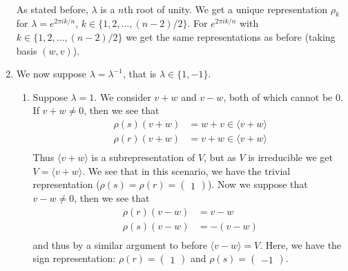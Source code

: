 \begin{questions}
\begin{solution}
\begin{enumerate}
\begin{align*}
            \end{align*}
            As stated before, $\lambda$ is a $n$th root of unity.
            We get a unique representation $\rho_k$ for $\lambda = e^{2\pi i k/n}$, $k \in \{1,2,\ldots,(n-2)/2\}$. For $e^{2\pi i k/n}$ with $k \in \{1,2,\ldots,(n-2)/2\}$ we get the same representations as before (taking basis $(w, v)$).
      \item We now suppose $\lambda = \lambda^{-1}$, that is $\lambda \in \{1, -1\}$.
            \begin{enumerate}
              \item Suppose $\lambda = 1$. We consider $v+w$ and $v-w$, both of which cannot be 0. If $v + w \neq 0$, then we see that
                    \begin{align*}
                      \rho(s)(v + w) & = w + v \in \langle v + w \rangle \\
                      \rho(r)(v + w) & = v + w \in \langle v + w \rangle \\
                    \end{align*}
                    Thus $\langle v + w \rangle$ is a subrepresentation of $V$, but as $V$ is irreducible we get $V = \langle v + w \rangle$. We see that in this scenario, we have the trivial representation ($\rho(s) = \rho(r) = \begin{pmatrix} 1 \end{pmatrix}$). Now we suppose that $v - w \neq 0$, then we see that
                    \begin{align*}
                      \rho(r)(v - w) & = v - w    \\
                      \rho(s)(v - w) & = -(v - w) \\
                    \end{align*}
                    and thus by a similar argument to before $\langle v - w \rangle = V$. Here, we have the sign representation: $\rho(r) = \begin{pmatrix} 1 \end{pmatrix}$ and $\rho(s) = \begin{pmatrix} -1 \end{pmatrix}$.


\end{enumerate}
\end{enumerate}
\end{solution}
\end{questions}
